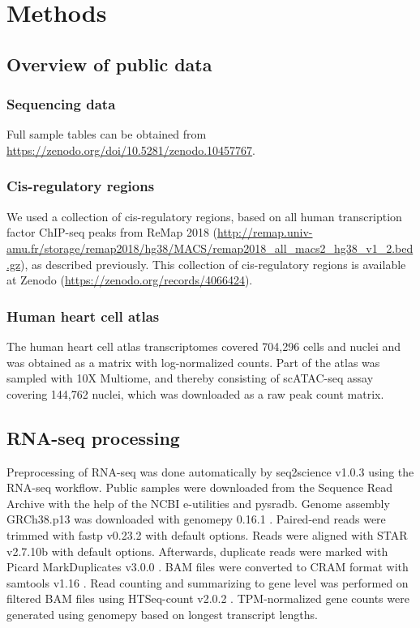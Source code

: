 \section{Methods}

\subsection{Overview of public data}

\subsubsection{Sequencing data}

Full sample tables can be obtained from \url{https://zenodo.org/doi/10.5281/zenodo.10457767}.

\subsubsection{Cis-regulatory regions}

We used a collection of cis-regulatory regions, based on all human transcription factor ChIP-seq peaks from ReMap 2018\cite{Chneby2017} (\url{http://remap.univ-amu.fr/storage/remap2018/hg38/MACS/remap2018_all_macs2_hg38_v1_2.bed.gz}), as described previously\cite{Xu_2020}. This collection of cis-regulatory regions is available at Zenodo (\url{https://zenodo.org/records/4066424}).

\subsubsection{Human heart cell atlas}

The human heart cell atlas transcriptomes covered 704,296 cells and nuclei and was obtained as a matrix with log-normalized counts\cite{HHCA_RNA_gene_matrix}. Part of the atlas was sampled with 10X Multiome, and thereby consisting of scATAC-seq assay covering 144,762 nuclei, which was downloaded as a raw peak count matrix\cite{HHCA_ATAC_peak_matrix}.

\subsection{RNA-seq processing}

Preprocessing of RNA-seq was done automatically by seq2science v1.0.3 \cite{seq2science} using the RNA-seq workflow. Public samples were downloaded from the Sequence Read Archive \cite{Leinonen2010} with the help of the NCBI e-utilities and pysradb\cite{Choudhary2019}. Genome assembly GRCh38.p13 was downloaded with genomepy 0.16.1 \cite{Frlich2023}. Paired-end reads were trimmed with fastp v0.23.2 \cite{Chen2018} with default options. Reads were aligned with STAR v2.7.10b \cite{Dobin2012} with default options. Afterwards, duplicate reads were marked with Picard MarkDuplicates v3.0.0 \cite{picard}. BAM files were converted to CRAM format with samtools v1.16 \cite{Danecek2021}. Read counting and summarizing to gene level was performed on filtered BAM files using HTSeq-count v2.0.2 \cite{Anders2014}. TPM-normalized gene counts were generated using genomepy based on longest transcript lengths.

